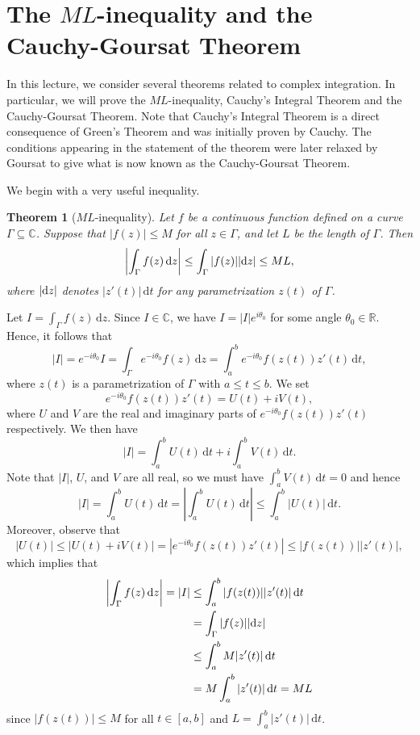 \documentclass[10pt]{article}
\makeatletter
\newcommand{\R}{\mathbb{R}}
\newcommand{\C}{\mathbb{C}}
\newcommand{\dd}{\,\mathrm{d}}
\theoremstyle{newstyle}
\newtheorem{thm}{Theorem}[section]
\newenvironment{pf}[1][\proofname]{\par
  \pushQED{\qed}%
  \normalfont \topsep0\p@\relax
  \trivlist
  \item[\hskip\labelsep\scshape
  #1\@addpunct{.}]\ignorespaces
}{%
  \popQED\endtrivlist\@endpefalse
}
\makeatother
\begin{document}
\newpage 
\section{The $ML$-inequality and the Cauchy-Goursat Theorem}

In this lecture, we consider several theorems related to complex integration.
In particular, we will prove the $ML$-inequality, Cauchy's Integral Theorem and the Cauchy-Goursat Theorem. Note that Cauchy's Integral Theorem is a direct consequence of Green's Theorem and was initially proven by Cauchy. The conditions appearing in the statement of the theorem were later relaxed by Goursat to give what is now known as the Cauchy-Goursat Theorem.

We begin with a very useful inequality.

\begin{thm}[$ML$-inequality]
Let $f$ be a continuous function defined on a curve $\Gamma \subseteq \C$. Suppose that 
$|f(z)| \leq M$ for all $z \in \Gamma$, and let $L$ be the length of $\Gamma$. Then 
\[ \left| \int_\Gamma f(z)\dd z \right| \leq \int_\Gamma |f(z)| |{\rm d}z| \leq ML, \]
where $|{\rm d}z|$ denotes $|z'(t)|\dd t$ for any parametrization $z(t)$ of $\Gamma$. 
\end{thm}
\begin{pf}
Let $I = \int_\Gamma f(z)\dd z$. Since $I \in \C$, we have 
$I = |I|e^{i\theta_0}$ for some angle $\theta_0 \in \R$. Hence, it follows that 
\[ |I| = e^{-i\theta_0} I = \int_\Gamma e^{-i\theta_0} f(z)\dd z = \int_a^b e^{-i\theta_0} 
f(z(t))z'(t)\dd t, \]
where $z(t)$ is a parametrization of $\Gamma$ with $a \leq t \leq b$. We set 
\[ e^{-i\theta_0} f(z(t)) z'(t) = U(t) + iV(t), \]
where $U$ and $V$ are the real and imaginary parts of $e^{-i\theta_0} f(z(t))z'(t)$ respectively. 
We then have 
\[ |I| = \int_a^b U(t)\dd t + i\int_a^b V(t)\dd t. \]
Note that $|I|$, $U$, and $V$ are all real, so we must have $\int_a^b V(t)\dd t = 0$ and hence 
\[ |I| = \int_a^b U(t) \dd t = \left| \int_a^b U(t)\dd t \right| \leq 
\int_a^b |U(t)|\dd t. \]
Moreover, observe that 
\[ |U(t)| \leq |U(t) + iV(t)| = |e^{-i\theta_0}f(z(t))z'(t)| \leq |f(z(t))||z'(t)|, \]
which implies that 
\begin{align*}
    \left| \int_\Gamma f(z)\dd z \right| = |I| 
    &\leq \int_a^b |f(z(t))||z'(t)|\dd t \\
    &= \int_\Gamma |f(z)||{\rm d}z| \\
    &\leq \int_a^b M|z'(t)|\dd t \\
    &= M \int_a^b |z'(t)|\dd t = ML
\end{align*}
since $|f(z(t))| \leq M$ for all $t \in [a, b]$ and $L = \int_a^b |z'(t)| \dd t$. 
\end{pf}
\end{document}
